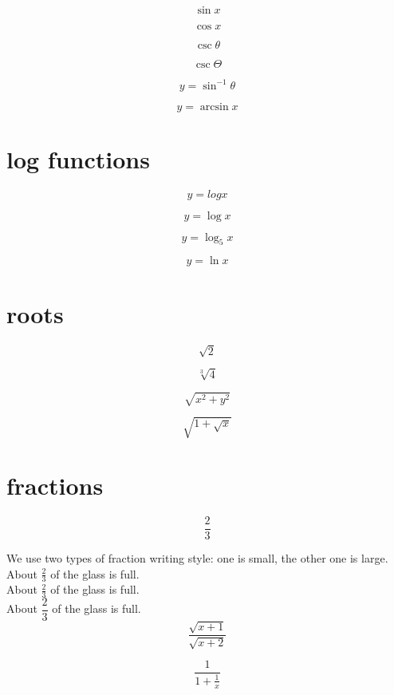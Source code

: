 \documentclass[11pt]{article}
\begin{document}
$$ \sin x$$

$$ \cos x$$

$$ \csc \theta$$

$$ \csc \Theta$$

$$ y= \sin^{-1} \theta $$

$$ y=\arcsin x $$

\section{ log functions}

$$y= logx$$

$$ y = \log x $$

$$ y= \log_5 x $$

$$ y = \ln x $$

\section{roots}

$$ \sqrt{2}$$

$$ \sqrt[3]{4} $$

$$ \sqrt{x^2 + y^2}$$

$$ \sqrt { 1	+  \sqrt{x}	} $$

\section{fractions}

$$ \frac{2	}	{3} $$

We use two types of fraction writing style: one is small, the other one is large. 
\\ [6pt]
About $\frac{2}{3}$ of the glass is full.
\\ [6pt]
About $\displaystyle \frac{2}{3}$ of the glass is full. 
\\ [6pt]
About $\dfrac{2}{3}$ of the glass is full.
\\ [6pt]

$$	 \frac{\sqrt{x+1}}{\sqrt{x+2}}  $$

$$ \frac  {1}   {  1 +  \frac  {1}  {x}  } $$
\end{document}
